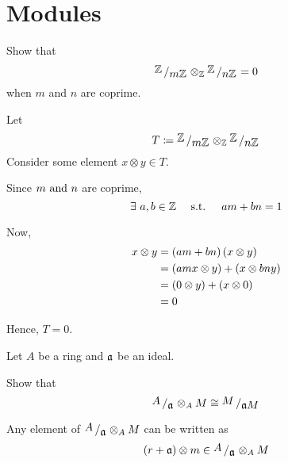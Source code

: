 \chapter{Modules} \label{ch:modules}

\begin{exercise}{}{}
	Show that
	\[
		\bigslant{\ZZ}{m \ZZ} \otimes_{\ZZ} \bigslant{\ZZ}{n \ZZ} = 0
	\]
	when \(m\) and \(n\) are coprime.
\end{exercise}

Let
\[
	T \coloneqq \bigslant{\ZZ}{m \ZZ} \otimes_{\ZZ} \bigslant{\ZZ}{n \ZZ}
\]
Consider some element \(x \otimes y \in T\).

Since \(m \text{ and } n\) are coprime,
\[
	\exists\ a, b \in \ZZ \qstq a m + b n = 1
\]

Now,
\begin{align*}
	x \otimes y &= (am + bn) \left( x \otimes y \right) \\
	&= \left( amx \otimes y \right) + \left( x \otimes bny \right) \\
	&= \left( 0 \otimes y \right) + \left( x \otimes 0 \right) \\
	&= 0
\end{align*}

Hence, \(T = 0\).

\begin{exercise}{}{}
	Let \(A\) be a ring and \(\mathfrak{a}\) be an ideal.

	Show that
	\[
		\bigslant{A}{\mfa} \otimes_A M \cong \bigslant{M}{\mfa M}
	\]
\end{exercise}

Any element of \(\bigslant{A}{\mfa} \otimes_A M\) can be written as
\begin{align*}
	\brak{r + \mfa} \otimes m \in \bigslant{A}{\mfa} \otimes_A M
\end{align*}